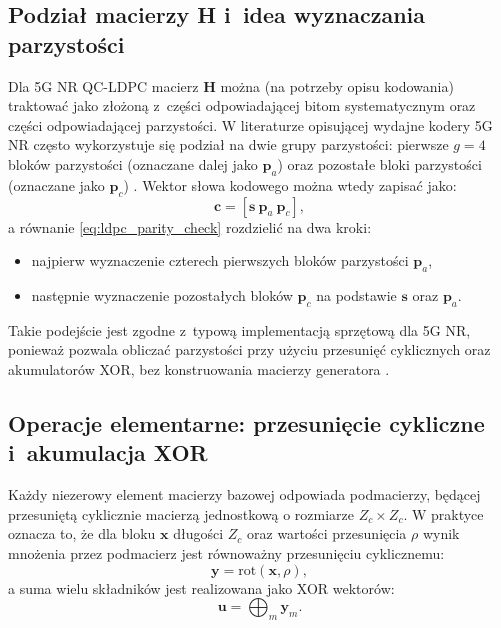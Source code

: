 \subsection{Podział macierzy \textbf{H} i~idea wyznaczania parzystości}
Dla 5G NR QC-LDPC macierz \textbf{H} można (na potrzeby opisu kodowania) traktować jako złożoną z~części odpowiadającej bitom
systematycznym oraz części odpowiadającej parzystości. W literaturze opisującej wydajne kodery 5G NR często wykorzystuje się
podział na dwie grupy parzystości: pierwsze $g=4$ bloków parzystości (oznaczane dalej jako $\mathbf{p}_a$) oraz pozostałe bloki
parzystości (oznaczane jako $\mathbf{p}_c$) \cite{bib:nguyen2019_qcldpc}.
Wektor słowa kodowego można wtedy zapisać jako:
\begin{equation}
\mathbf{c} = \left[\mathbf{s} \ \mathbf{p}_a \ \mathbf{p}_c\right],
\label{eq:codeword_split}
\end{equation}
a równanie \eqref{eq:ldpc_parity_check} rozdzielić na dwa kroki:
\begin{itemize}
  \item najpierw wyznaczenie czterech pierwszych bloków parzystości $\mathbf{p}_a$,
  \item następnie wyznaczenie pozostałych bloków $\mathbf{p}_c$ na podstawie $\mathbf{s}$ oraz $\mathbf{p}_a$.
\end{itemize}
Takie podejście jest zgodne z~typową implementacją sprzętową dla 5G NR, ponieważ pozwala obliczać parzystości
przy użyciu przesunięć cyklicznych oraz akumulatorów XOR, bez konstruowania macierzy generatora \cite{bib:nguyen2019_qcldpc}.

\subsection{Operacje elementarne: przesunięcie cykliczne i~akumulacja XOR}
Każdy niezerowy element macierzy bazowej odpowiada podmacierzy, będącej przesuniętą cyklicznie macierzą jednostkową
o rozmiarze $Z_c \times Z_c$. W praktyce oznacza to, że dla bloku $\mathbf{x}$ długości $Z_c$ oraz wartości przesunięcia $\rho$
wynik mnożenia przez podmacierz jest równoważny przesunięciu cyklicznemu:
\begin{equation}
\mathbf{y} = \mathrm{rot}(\mathbf{x},\rho),
\label{eq:rot}
\end{equation}
a suma wielu składników jest realizowana jako XOR wektorów:
\begin{equation}
\mathbf{u} = \bigoplus_{m} \mathbf{y}_m.
\label{eq:xor_sum}
\end{equation}

